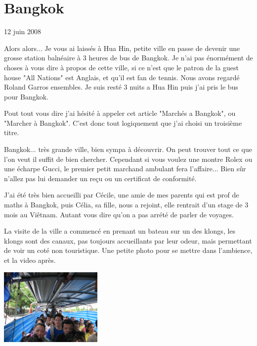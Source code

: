 \section{Bangkok}

12 juin 2008

\begin{multicols}{2}

Alors alors... Je vous ai laissés à Hua Hin, petite ville en passe de devenir une grosse station balnéaire à 3 heures de bus de Bangkok. Je n'ai pas énormément de choses à vous dire à propos de cette ville, si ce n'est que le patron de la guest house "All Nations" est Anglais, et qu'il est fan de tennis. Nous avons regardé Roland Garros ensembles. Je suis resté 3 nuits a Hua Hin puis j'ai pris le bus pour Bangkok.

Pout tout vous dire j'ai hésité à appeler cet article "Marchés a Bangkok", ou "Marcher à Bangkok". C'est donc tout logiquement que j'ai choisi un troisième titre.

Bangkok... très grande ville, bien sympa à découvrir. On peut trouver tout ce que l'on veut il suffit de bien chercher. Cependant si vous voulez une montre Rolex ou une écharpe Gucci, le premier petit marchand ambulant fera l'affaire... Bien sûr n'allez pas lui demander un reçu ou un certificat de conformité.

J'ai été très bien accueilli par Cécile, une amie de mes parents qui est prof de maths à Bangkok, puis Célia, sa fille, nous a rejoint, elle rentrait d'un stage de 3 mois au Viêtnam. Autant vous dire qu'on a pas arrété de parler de voyages.

La visite de la ville a commencé en prenant un bateau sur un des klongs, les klongs sont des canaux, pas toujours accueillants par leur odeur, mais permettant de voir un coté non touristique. Une petite photo pour se mettre dans l'ambience, et la video après.

\smallbreak
\hspace*{-0.65cm}
\includegraphics[width=5cm]{articles/Bangkok/1345.jpg}
\smallbreak



\end{multicols}
